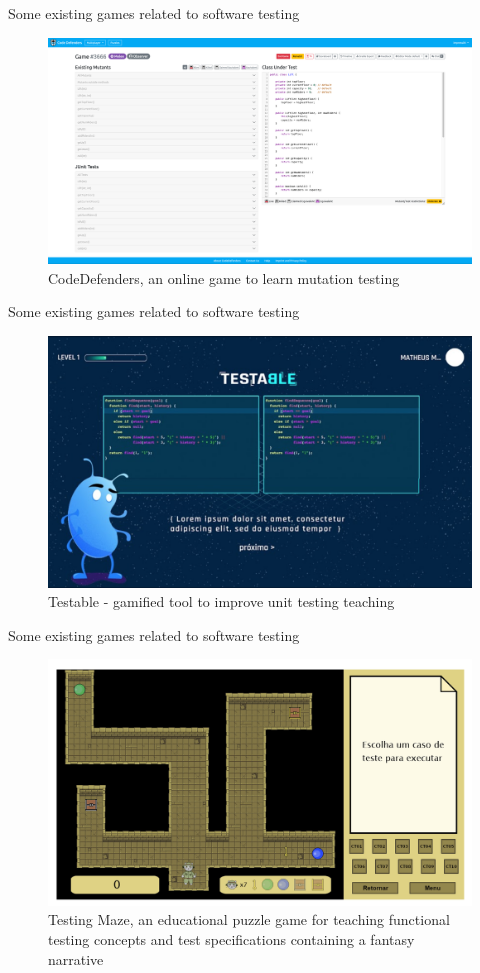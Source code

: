 \documentclass[aspectratio=169]{beamer}
\begin{document}
\begin{frame}{Some existing games related to software testing}
\begin{figure}
    \centering
    \includegraphics[width=0.75\linewidth]{presentation//images//games/codedefenders.png}
    \caption{CodeDefenders, an online game to learn mutation testing}
\end{figure}
\end{frame}

\begin{frame}{Some existing games related to software testing}
\begin{figure}
    \centering
    \includegraphics[width=0.75\linewidth]{presentation//images//games/testable}
    \caption{Testable - gamified tool to improve unit testing teaching}
\end{figure}
\end{frame}

\begin{frame}{Some existing games related to software testing}
\begin{figure}
    \centering
    \includegraphics[width=0.75\linewidth]{presentation//images//games/testingmaze}
    \caption{Testing Maze, an educational puzzle game for teaching functional testing concepts and test specifications containing a fantasy narrative}
\end{figure}
\end{frame}
\end{document}
